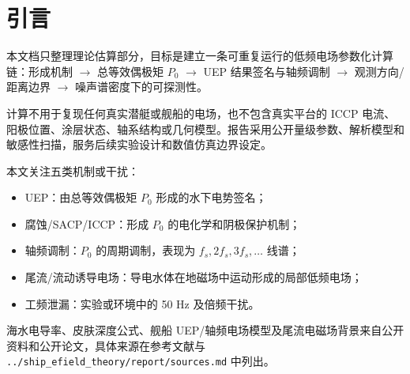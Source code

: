 \section{引言}

本文档只整理理论估算部分，目标是建立一条可重复运行的低频电场参数化计算链：形成机制 $\rightarrow$ 总等效偶极矩 $P_0$ $\rightarrow$ UEP 结果签名与轴频调制 $\rightarrow$ 观测方向/距离边界 $\rightarrow$ 噪声谱密度下的可探测性。

计算不用于复现任何真实潜艇或舰船的电场，也不包含真实平台的 ICCP 电流、阳极位置、涂层状态、轴系结构或几何模型。报告采用公开量级参数、解析模型和敏感性扫描，服务后续实验设计和数值仿真边界设定。

本文关注五类机制或干扰：
\begin{itemize}
    \item UEP：由总等效偶极矩 $P_0$ 形成的水下电势签名；
    \item 腐蚀/SACP/ICCP：形成 $P_0$ 的电化学和阴极保护机制；
    \item 轴频调制：$P_0$ 的周期调制，表现为 $f_s,2f_s,3f_s,\ldots$ 线谱；
    \item 尾流/流动诱导电场：导电水体在地磁场中运动形成的局部低频电场；
    \item 工频泄漏：实验或环境中的 50 Hz 及倍频干扰。
\end{itemize}

海水电导率、皮肤深度公式、舰船 UEP/轴频电场模型及尾流电磁场背景来自公开资料和公开论文，具体来源在参考文献与 \texttt{../ship\_efield\_theory/report/sources.md} 中列出。
